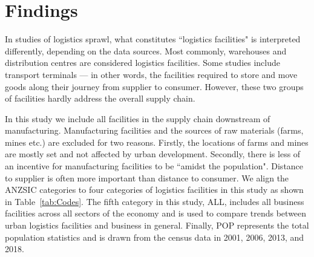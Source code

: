 \documentclass[3p, a4paper, authoryear, 11pt, fleqn, review]{elsarticle}
\newcommand{\nmt}[1]{{\color{ForestGreen}{~(nmt: #1)}}}
\begin{document}


\section{Findings}
\label{sec:Findings}
In studies of logistics sprawl, what constitutes ``logistics facilities" is interpreted differently, depending on the data sources. Most commonly, warehouses and distribution centres are considered logistics facilities. Some studies include transport terminals --- in other words, the facilities required to store and move goods along their journey from supplier to consumer. However, these two groups of facilities hardly address the overall supply chain. 

In this study we include all facilities in the supply chain downstream of manufacturing. Manufacturing facilities and the sources of raw materials (farms, mines etc.) are excluded for two reasons. Firstly, the locations of farms and mines are mostly set and not affected by urban development. Secondly, there is less of an incentive for manufacturing facilities to be ``amidst the population". Distance to supplier is often more important than distance to consumer. We align the \ac{ANZSIC} categories to four categories of logistics facilities in this study as shown in Table~\ref{tab:Codes}. The fifth category in this study, ALL, includes all business facilities across all sectors of the economy and is used to compare trends between urban logistics facilities and business in general. Finally, POP represents the total population statistics and is drawn from the census data in 2001, 2006, 2013, and 2018. 
\end{document}
